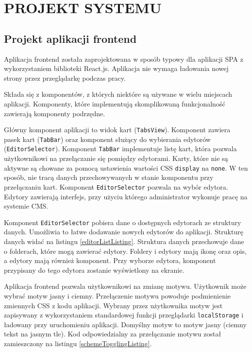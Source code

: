 \section{PROJEKT SYSTEMU}

\subsection{Projekt aplikacji frontend}

Aplikacja frontend została zaprojektowana w sposób typowy dla aplikacji SPA
\cite{mikowski2013single} z wykorzystaniem biblioteki React.js. Aplikacja nie
wymaga ładowania nowej strony przez przeglądarkę podczas pracy.

Składa się z komponentów, z których niektóre są używane w wielu miejscach
aplikacji. Komponenty, które implementują skomplikowaną funkcjonalność zawierają
komponenty podrzędne.

Główny komponent aplikacji to widok kart (\verb|TabsView|). Komponent zawiera
pasek kart (\verb|TabBar|) oraz komponent służący do wybierania edytorów
(\verb|EditorSelector|). Komponent \verb|TabBar| implementuje listę kart, która
pozwala użytkownikowi na przełączanie się pomiędzy edytorami. Karty, które nie
są aktywne są chowane za pomocą ustawienia wartości CSS \verb|display| na
\verb|none|. W ten sposób, nie tracą danych przechowywanych w stanie komponentu
przy przełączaniu kart. Komponent \verb|EditorSelector| pozwala na wybór
edytora. Edytory zawierają interfejs, przy użyciu którego administrator wykonuje
pracę na systemie CMS.

Komponent \verb|EditorSelector| pobiera dane o dostępnych edytorach ze struktury
danych. Umożliwia to łatwe dodawanie nowych edytorów do aplikacji. Strukturę
danych widać na listingu \ref{editorListListing}. Struktura danych przechowuje
dane o folderach, które mogą zawierać edytory. Foldery i edytory mają ikonę oraz
opis, a edytory mają również komponent. Przy wyborze edytora, komponent
przypisany do tego edytora zostanie wyświetlony na ekranie.



Aplikacja frontend pozwala użytkownikowi na zmianę motywu. Użytkownik może
wybrać motyw jasny i ciemny. Przełączenie motywu powoduje podmienienie zmiennych
CSS z kodu aplikacji. Wybrany przez użytkownika motyw jest zapisywany z
wykorzystaniem standardowej funkcji przeglądarki \verb|localStorage| i ładowany
przy uruchomieniu aplikacji. Domyślny motyw to motyw jasny (ciemny tekst na
jasnym tle). Kod odpowiedzialny za przełączanie motywu został zamieszczony na listingu
\ref{schemeTogglingListing}.

